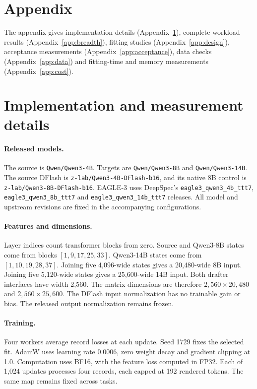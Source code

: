 \documentclass{article}
\begin{document}
\section*{Appendix}
The appendix gives implementation details (Appendix~\ref{app:protocol}),
complete workload results (Appendix~\ref{app:breadth}), fitting studies
(Appendix~\ref{app:design}), acceptance measurements
(Appendix~\ref{app:acceptance}), data checks (Appendix~\ref{app:data})
and fitting-time and memory measurements (Appendix~\ref{app:cost}).

\section{Implementation and measurement details}
\label{app:protocol}

\paragraph{Released models.}
The source is \texttt{Qwen/Qwen3-4B}. Targets are
\texttt{Qwen/Qwen3-8B} and \texttt{Qwen/Qwen3-14B}.
The source DFlash is \texttt{z-lab/Qwen3-4B-DFlash-b16}, and its native
8B control is \texttt{z-lab/Qwen3-8B-DFlash-b16}. EAGLE-3 uses DeepSpec's
\texttt{eagle3\_qwen3\_4b\_ttt7}, \texttt{eagle3\_qwen3\_8b\_ttt7}
and \texttt{eagle3\_qwen3\_14b\_ttt7} releases. All model and upstream
revisions are fixed in the accompanying configurations.

\paragraph{Features and dimensions.}
Layer indices count transformer blocks from zero. Source and Qwen3-8B
states come from blocks $[1,9,17,25,33]$. Qwen3-14B states come from
$[1,10,19,28,37]$. Joining five 4,096-wide states gives a 20,480-wide
8B input. Joining five 5,120-wide states gives a 25,600-wide 14B input.
Both drafter interfaces have width 2,560. The matrix dimensions are
therefore $2,560\times20,480$ and $2,560\times25,600$.
The DFlash input normalization has no trainable gain or bias. The
released output normalization remains frozen.

\paragraph{Training.}
Four workers average record losses at each update. Seed 1729 fixes the
selected fit. AdamW uses learning rate 0.0006, zero weight decay and
gradient clipping at 1.0. Computation uses BF16, with the feature loss
computed in FP32. Each of 1,024 updates processes four records, each
capped at 192 rendered tokens. The same map remains fixed across tasks.
\end{document}
